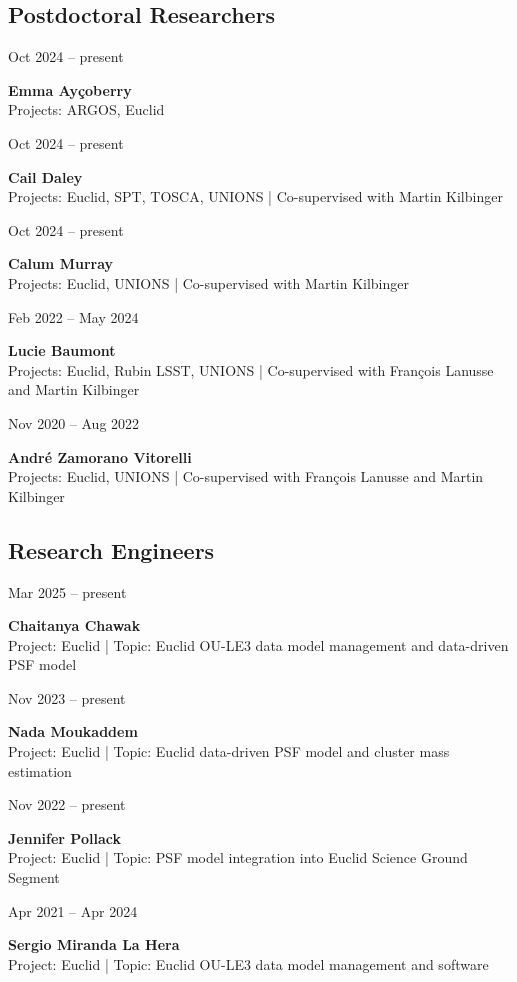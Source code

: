 \documentclass[a4paper,10pt]{article}
\newlength{\cvdatew}
\newcommand{\cvline}[2]{%
  \vspace{2pt}%
  \noindent\begin{minipage}[t]{\cvdatew}%
    \raggedright\small\color{muted}#1%
  \end{minipage}%
  \hspace{0.6em}%
  \begin{minipage}[t]{\dimexpr\linewidth-\cvdatew-0.6em\relax}%
    #2%
  \end{minipage}%
  \vspace{2pt}%
}
\begin{document}
\subsection{Postdoctoral Researchers}

\cvline{Oct 2024 -- present}{\textbf{Emma Ay\c{c}oberry}\\
  {\small\color{muted}Projects: ARGOS, Euclid}}

\cvline{Oct 2024 -- present}{\textbf{Cail Daley}\\
  {\small\color{muted}Projects: Euclid, SPT, TOSCA, UNIONS | Co-supervised with Martin Kilbinger}}

\cvline{Oct 2024 -- present}{\textbf{Calum Murray}\\
  {\small\color{muted}Projects: Euclid, UNIONS | Co-supervised with Martin Kilbinger}}

\cvline{Feb 2022 -- May 2024}{\textbf{Lucie Baumont}\\
  {\small\color{muted}Projects: Euclid, Rubin LSST, UNIONS | Co-supervised with Fran\c{c}ois Lanusse and Martin Kilbinger}}

\cvline{Nov 2020 -- Aug 2022}{\textbf{Andr\'e Zamorano Vitorelli}\\
  {\small\color{muted}Projects: Euclid, UNIONS | Co-supervised with Fran\c{c}ois Lanusse and Martin Kilbinger}}

\subsection{Research Engineers}

\cvline{Mar 2025 -- present}{\textbf{Chaitanya Chawak}\\
  {\small\color{muted}Project: Euclid | Topic: Euclid OU-LE3 data model management and data-driven PSF model}}

\cvline{Nov 2023 -- present}{\textbf{Nada Moukaddem}\\
  {\small\color{muted}Project: Euclid | Topic: Euclid data-driven PSF model and cluster mass estimation}}

\cvline{Nov 2022 -- present}{\textbf{Jennifer Pollack}\\
  {\small\color{muted}Project: Euclid | Topic: PSF model integration into Euclid Science Ground Segment}}

\cvline{Apr 2021 -- Apr 2024}{\textbf{Sergio Miranda La Hera}\\
  {\small\color{muted}Project: Euclid | Topic: Euclid OU-LE3 data model management and software}}
\end{document}
